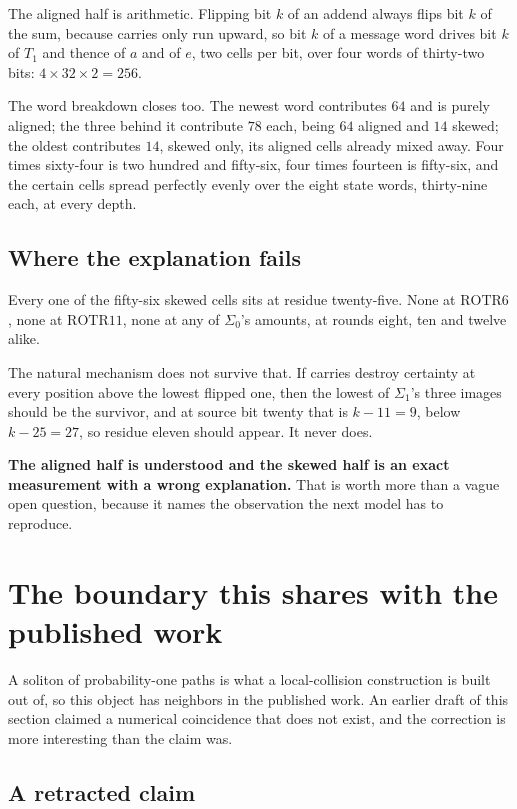 The aligned half is arithmetic. Flipping bit \(k\) of an addend always flips bit \(k\) of the sum,
because carries only run upward, so bit \(k\) of a message word drives bit \(k\) of \(T_1\) and
thence of \(a\) and of \(e\), two cells per bit, over four words of thirty-two bits:
\(4 \times 32 \times 2 = 256\).

The word breakdown closes too. The newest word contributes \(64\) and is purely aligned; the three
behind it contribute \(78\) each, being \(64\) aligned and \(14\) skewed; the oldest contributes
\(14\), skewed only, its aligned cells already mixed away. Four times sixty-four is two hundred and
fifty-six, four times fourteen is fifty-six, and the certain cells spread perfectly evenly over the
eight state words, thirty-nine each, at every depth.

\subsection{Where the explanation fails}

Every one of the fifty-six skewed cells sits at residue twenty-five. None at \(\mathrm{ROTR}6\),
none at \(\mathrm{ROTR}11\), none at any of \(\Sigma_0\)'s amounts, at rounds eight, ten and twelve
alike.

The natural mechanism does not survive that. If carries destroy certainty at every position above
the lowest flipped one, then the lowest of \(\Sigma_1\)'s three images should be the survivor, and
at source bit twenty that is \(k - 11 = 9\), below \(k - 25 = 27\), so residue eleven should appear.
It never does.

\textbf{The aligned half is understood and the skewed half is an exact measurement with a wrong
explanation.} That is worth more than a vague open question, because it names the observation the
next model has to reproduce.

\section{The boundary this shares with the published work}

A soliton of probability-one paths is what a local-collision construction is built out of, so this
object has neighbors in the published work. An earlier draft of this section claimed a numerical
coincidence that does not exist, and the correction is more interesting than the claim was.

\subsection{A retracted claim}

